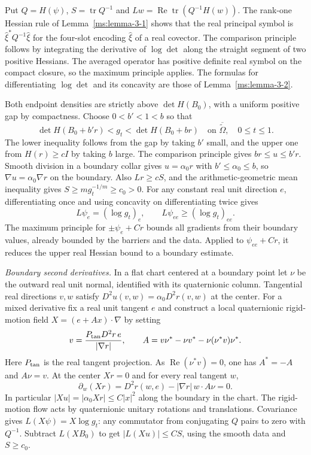 Put $Q=H(\psi)$, $S=\operatorname{tr}Q^{-1}$ and
$Lw=\operatorname{Re}\operatorname{tr}(Q^{-1}H(w))$. The rank-one Hessian rule of Lemma~\ref{ms:lemma-3-1} shows that the real principal symbol is $\widehat\xi^*Q^{-1}\widehat\xi$ for the four-slot encoding $\widehat\xi$ of a real covector. The comparison principle follows by integrating the derivative of $\log\det$ along the straight segment of two positive Hessians. The averaged operator has positive definite real symbol on the compact closure, so the maximum principle applies. The formulas for differentiating $\log\det$ and its concavity are those of Lemma~\ref{ms:lemma-3-2}.

Both endpoint densities are strictly above $\det H(B_0)$, with a uniform positive gap by compactness. Choose $0<b'<1<b$ so that
\[
 \det H(B_0+b'r)<g_t<\det H(B_0+br)
 \quad\text{on }\overline{\widetilde\Omega},\quad 0\le t\le1.
\]
The lower inequality follows from the gap by taking $b'$ small, and the upper one from $H(r)\ge cI$ by taking $b$ large. The comparison principle gives $br\le u\le b'r$. Smooth division in a boundary collar gives $u=\alpha_0r$ with $b'\le\alpha_0\le b$, so $\nabla u=\alpha_0\nabla r$ on the boundary. Also $Lr\ge cS$, and the arithmetic-geometric mean inequality gives $S\ge mg_t^{-1/m}\ge c_0>0$. For any constant real unit direction $e$, differentiating once and using concavity on differentiating twice gives
\[
 L\psi_e=(\log g_t)_e,\qquad L\psi_{ee}\ge(\log g_t)_{ee}.
\]
The maximum principle for $\pm\psi_e+Cr$ bounds all gradients from their boundary values, already bounded by the barriers and the data. Applied to $\psi_{ee}+Cr$, it reduces the upper real Hessian bound to a boundary estimate.

\emph{Boundary second derivatives.} In a flat chart centered at a boundary point let $\nu$ be the outward real unit normal, identified with its quaternionic column. Tangential real directions $v,w$ satisfy $D^2u(v,w)=\alpha_0D^2r(v,w)$ at the center. For a mixed derivative fix a real unit tangent $e$ and construct a local quaternionic rigid-motion field $X=(e+Ax)\cdot\nabla$ by setting
\[
 v=\frac{P_{\rm tan}D^2r\,e}{|\nabla r|},\qquad
 A=v\nu^*-\nu v^*-\nu(\nu^*v)\nu^* .
\]
Here $P_{\rm tan}$ is the real tangent projection. As $\operatorname{Re}(\nu^*v)=0$, one has $A^*=-A$ and $A\nu=v$. At the center $Xr=0$ and for every real tangent $w$,
\[
 \partial_w(Xr)=D^2r(w,e)-|\nabla r|\,w\cdot A\nu=0.
\]
In particular $|Xu|=|\alpha_0Xr|\le C|x|^2$ along the boundary in the chart. The rigid-motion flow acts by quaternionic unitary rotations and translations. Covariance gives $L(X\psi)=X\log g_t$: any commutator from conjugating $Q$ pairs to zero with $Q^{-1}$. Subtract $L(XB_0)$ to get $|L(Xu)|\le CS$, using the smooth data and $S\ge c_0$.

